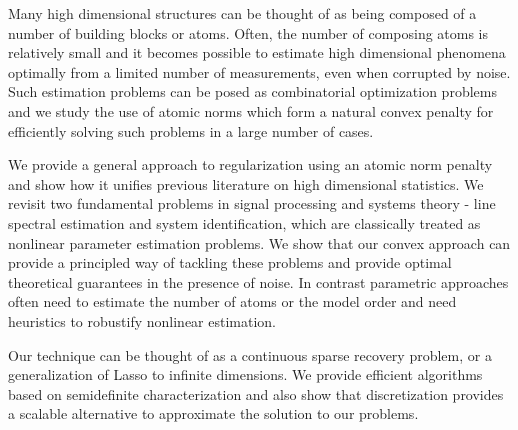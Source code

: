 Many high dimensional structures can be thought of as being composed of a number
of building blocks or atoms. Often, the number of composing atoms is relatively
small and it becomes possible to estimate high dimensional phenomena optimally
from a limited number of measurements, even when corrupted by noise. Such
estimation problems can be posed as combinatorial optimization problems and we
study the use of atomic norms which form a natural convex penalty for
efficiently solving such problems in a large number of cases.

We provide a general approach to regularization using an atomic norm penalty and
show how it unifies previous literature on high dimensional statistics. We
revisit two fundamental problems in signal processing and systems theory - line
spectral estimation and system identification, which are classically treated as
nonlinear parameter estimation problems. We show that our convex approach can
provide a principled way of tackling these problems and provide optimal
theoretical guarantees in the presence of noise. In contrast parametric
approaches often need to estimate the number of atoms or the model order and
need heuristics to robustify nonlinear estimation.

Our technique can be thought of as a continuous sparse recovery problem, or a
generalization of Lasso to infinite dimensions. We provide efficient algorithms
based on semidefinite characterization and also show that discretization
provides a scalable alternative to approximate the solution to our problems.

